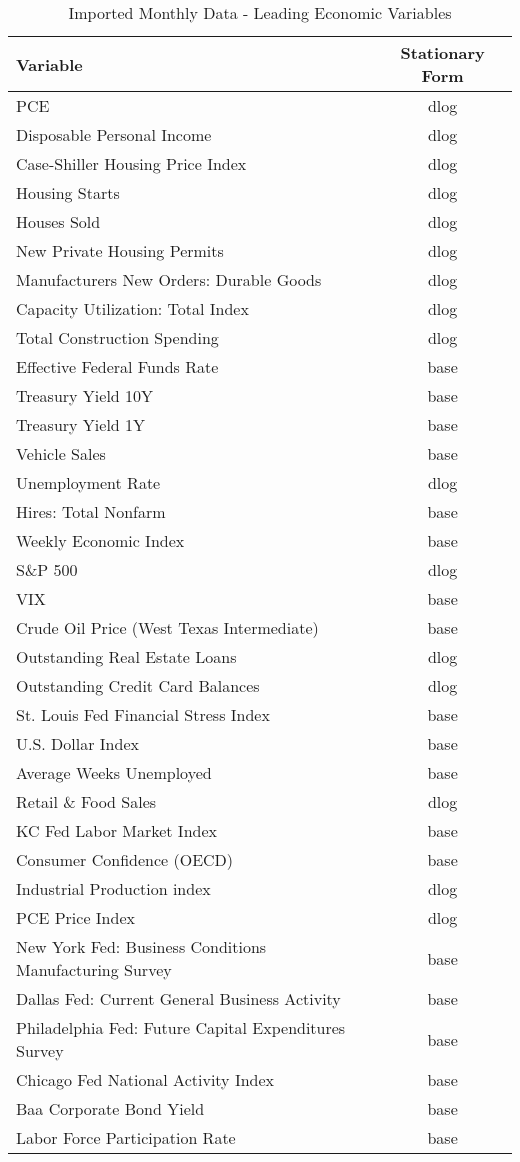 \documentclass[11pt, letterpaper]{article}\usepackage[]{graphicx}\usepackage[]{color}
\begin{document}
\begin{table}[H]
\centering
\begingroup\scriptsize
\begin{tabular}{lc}
  \hline
Variable & Stationary Form \\ 
  \hline
PCE & dlog \\ 
  Disposable Personal Income & dlog \\ 
  Case-Shiller Housing Price Index & dlog \\ 
  Housing Starts & dlog \\ 
  Houses Sold & dlog \\ 
  New Private Housing Permits & dlog \\ 
  Manufacturers New Orders: Durable Goods & dlog \\ 
  Capacity Utilization: Total Index & dlog \\ 
  Total Construction Spending & dlog \\ 
  Effective Federal Funds Rate & base \\ 
  Treasury Yield 10Y & base \\ 
  Treasury Yield 1Y & base \\ 
  Vehicle Sales & base \\ 
  Unemployment Rate & dlog \\ 
  Hires: Total Nonfarm & base \\ 
  Weekly Economic Index & base \\ 
  S\&P 500 & dlog \\ 
  VIX & base \\ 
  Crude Oil Price (West Texas Intermediate) & base \\ 
  Outstanding Real Estate Loans & dlog \\ 
  Outstanding Credit Card Balances & dlog \\ 
  St. Louis Fed Financial Stress Index & base \\ 
  U.S. Dollar Index & base \\ 
  Average Weeks Unemployed & base \\ 
  Retail \& Food Sales & dlog \\ 
  KC Fed Labor Market Index & base \\ 
  Consumer Confidence (OECD) & base \\ 
  Industrial Production index & dlog \\ 
  PCE Price Index & dlog \\ 
  New York Fed: Business Conditions Manufacturing Survey & base \\ 
  Dallas Fed: Current General Business Activity & base \\ 
  Philadelphia Fed: Future Capital Expenditures Survey & base \\ 
  Chicago Fed National Activity Index & base \\ 
  Baa Corporate Bond Yield & base \\ 
  Labor Force Participation Rate & base \\ 
   \hline
\end{tabular}
\endgroup
\caption{Imported Monthly Data - Leading Economic Variables} 
\end{table}
\end{document}
